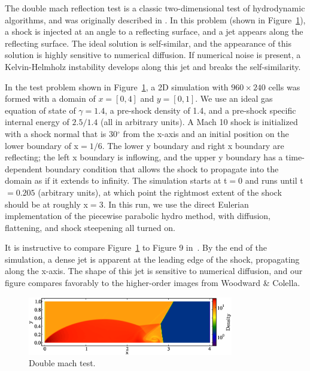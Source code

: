 The double mach reflection test is a classic two-dimensional test of
hydrodynamic algorithms, and was originally described in
\citet{1984JCoPh..54..115W} \citep[and more recently
in][]{2008ApJS..178..137S}.  In this problem (shown in
Figure~\ref{fig.doublemach}), a shock is injected at an angle to a
reflecting surface, and a jet appears along the reflecting surface.
The ideal solution is self-similar, and the appearance of this
solution is highly sensitive to numerical diffusion.  If numerical
noise is present, a Kelvin-Helmholz instability develops along this
jet and breaks the self-similarity.

In the test problem shown in Figure~\ref{fig.doublemach}, a 2D
simulation with $960 \times 240$ cells was formed with a domain of $x
= [0, 4]$ and $y = [0, 1]$.  We use an ideal gas equation of state of
$\gamma = 1.4$, a pre-shock density of 1.4, and a pre-shock specific
internal energy of $2.5/1.4$ (all in arbitrary units).  A Mach 10
shock is initialized with a shock normal that is 30$^\circ$ from the
x-axis and an initial position on the lower boundary of x$ = 1/6$.
The lower y boundary and right x boundary are reflecting; the left x
boundary is inflowing, and the upper y boundary has a time-dependent
boundary condition that allows the shock to propagate into the domain
as if it extends to infinity.  The simulation starts at t$ = 0$ and
runs until t$ = 0.205$ (arbitrary units), at which point the rightmost
extent of the shock should be at roughly x$ = 3$.  In this run, we use
the direct Eulerian implementation of the piecewise parabolic hydro
method, with diffusion, flattening, and shock steepening all turned
on.

It is instructive to compare Figure~\ref{fig.doublemach} to Figure 9
in~\citet{1984JCoPh..54..115W}.  By the end of the simulation, a dense
jet is apparent at the leading edge of the shock, propagating along
the x-axis.  The shape of this jet is sensitive to numerical
diffusion, and our figure compares favorably to the higher-order
images from Woodward \& Colella.

\begin{figure}
\begin{center}
\includegraphics[width=0.8\textwidth]{figures/DoubleMachTest.eps}
\caption{Double mach test.}
\label{fig.doublemach}
\end{center}
\end{figure}

